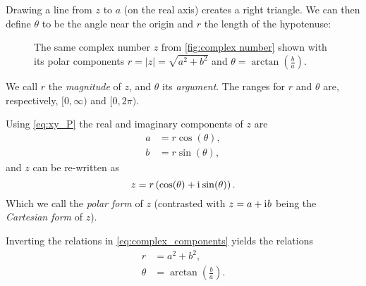Drawing a line from $z$ to $a$ (on the real axis) creates a right triangle. We can then define $\theta$ to be the angle near the origin and $r$ the length of the hypotenuse:
\begin{figure}
	\centering
	\caption{The same complex number $z$ from \autoref{fig:complex number} shown with its polar components $r=|z|=\sqrt{a^{2}+b^{2}}$ and $\theta=\arctan\left( \frac{b}{a} \right)$.}
	\label{fig:complex number 2}
\end{figure}
We call $r$ the \emph{magnitude} of $z$, and $\theta$ its \emph{argument}. The ranges for $r$ and $\theta$ are, respectively, $[0,\infty)$ and $[0,2\pi)$.

Using \autoref{eq:xy_P} the real and imaginary components of $z$ are
\begin{align}
	a &= r\cos(\theta),\nonumber\\
	b &= r\sin(\theta),
	\label{eq:complex_components}
\end{align}
and $z$ can be re-written as
\begin{equation}
	z = r\left( \cos(\theta) + \mathrm{i}\mkern1mu\sin(\theta) \right).
	\label{eq:complex_geometric_form}
\end{equation}
Which we call the \emph{polar form} of $z$ (contrasted with $z=a+\mathrm{i}\mkern1mu b$ being the \emph{Cartesian form} of $z$).

Inverting the relations in \autoref{eq:complex_components} yields the relations
\begin{align}
	r &= a^{2}+b^{2},\nonumber\\
	\theta &= \arctan\left(\frac{b}{a}\right).
	\label{eq:complex_components_geometric}
\end{align}

